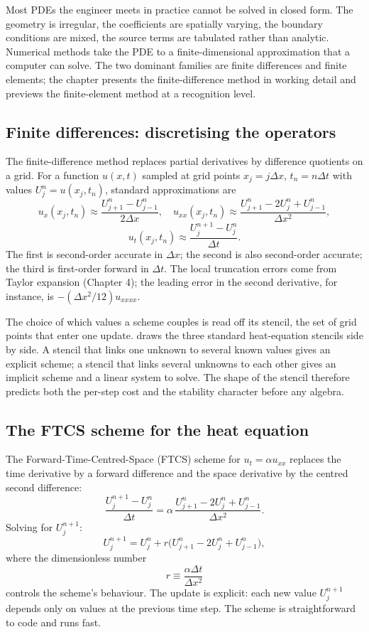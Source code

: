 Most PDEs the engineer meets in practice cannot be solved in
closed form. The geometry is irregular, the coefficients are
spatially varying, the boundary conditions are mixed, the source
terms are tabulated rather than analytic. Numerical methods take
the PDE to a finite-dimensional approximation that a computer can
solve. The two dominant families are finite differences and finite
elements; the chapter presents the finite-difference method in
working detail and previews the finite-element method at a
recognition level.

\subsection{Finite differences: discretising the operators}

The finite-difference method replaces partial derivatives by
difference quotients on a grid. For a function $u(x, t)$ sampled
at grid points $x_{j} = j \Delta x$, $t_{n} = n \Delta t$ with
values $U_{j}^{n} = u(x_{j}, t_{n})$, standard approximations are
\[
u_{x}(x_{j}, t_{n}) \approx \frac{U_{j+1}^{n} - U_{j-1}^{n}}{2 \Delta x}, \quad u_{xx}(x_{j}, t_{n}) \approx \frac{U_{j+1}^{n} - 2 U_{j}^{n} + U_{j-1}^{n}}{\Delta x^{2}},
\]
\[
u_{t}(x_{j}, t_{n}) \approx \frac{U_{j}^{n+1} - U_{j}^{n}}{\Delta t}.
\]
The first is second-order accurate in $\Delta x$; the second is
also second-order accurate; the third is first-order forward in
$\Delta t$. The local truncation errors come from Taylor
expansion (Chapter 4); the leading error in the second
derivative, for instance, is $-(\Delta x^{2}/12) u_{xxxx}$.

The choice of which values a scheme couples is read off its
stencil, the set of grid points that enter one update.
 draws the three standard
heat-equation stencils side by side. A stencil that links one
unknown to several known values gives an explicit scheme; a stencil
that links several unknowns to each other gives an implicit scheme
and a linear system to solve. The shape of the stencil therefore
predicts both the per-step cost and the stability character before
any algebra.



\subsection{The FTCS scheme for the heat equation}

The Forward-Time-Centred-Space (FTCS) scheme for $u_{t} = \alpha
u_{xx}$ replaces the time derivative by a forward difference and
the space derivative by the centred second difference:
\[
\frac{U_{j}^{n+1} - U_{j}^{n}}{\Delta t} = \alpha\, \frac{U_{j+1}^{n} - 2 U_{j}^{n} + U_{j-1}^{n}}{\Delta x^{2}}.
\]
Solving for $U_{j}^{n+1}$:
\[
U_{j}^{n+1} = U_{j}^{n} + r\bigl(U_{j+1}^{n} - 2 U_{j}^{n} + U_{j-1}^{n}\bigr),
\]
where the dimensionless number
\[
r \equiv \frac{\alpha \Delta t}{\Delta x^{2}}
\]
controls the scheme's behaviour. The update is explicit: each
new value $U_{j}^{n+1}$ depends only on values at the previous
time step. The scheme is straightforward to code and runs fast.

